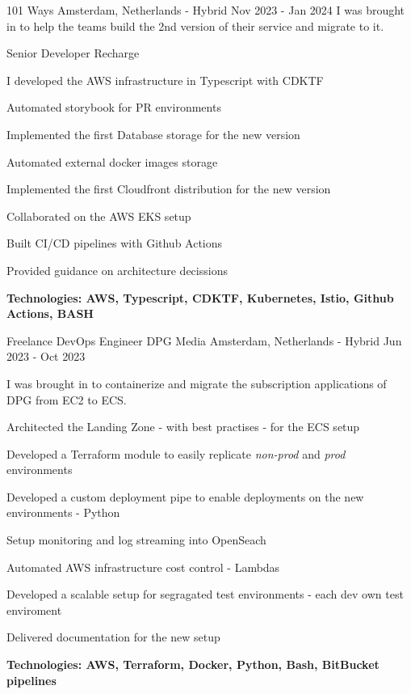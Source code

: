 \begin{cventries}
{101 Ways}
{Amsterdam, Netherlands - Hybrid}
{Nov 2023 - Jan 2024}
{I was brought in to help the teams build the 2nd version of their service and migrate to it.}
\hfill\begin{minipage}{\dimexpr\textwidth-1cm}
\xdef\tpd{\the\prevdepth}
\begin{cventrystack}
	\cventry
	{Senior Developer} %
	{Recharge} %
	{}
	{}
	{
		\begin{cvitems}
			\item {I developed the AWS infrastructure in Typescript with CDKTF}
			\item {Automated storybook for PR environments}
			\item {Implemented the first Database storage for the new version}
			\item {Automated external docker images storage}
			\item {Implemented the first Cloudfront distribution for the new version}
			\item {Collaborated on the AWS EKS setup}
			\item {Built CI/CD pipelines with Github Actions}
			\item {Provided guidance on architecture decissions}
			\item {\bfseries{Technologies:} AWS, Typescript, CDKTF, Kubernetes, Istio, Github Actions, BASH}
		\end{cvitems}
	}
\end{cventrystack}
\end{minipage}

\cventry
{Freelance DevOps Engineer} %
{DPG Media} %
{Amsterdam, Netherlands - Hybrid} %
{Jun 2023 - Oct 2023} %
{ %
I was brought in to containerize and migrate the subscription applications of DPG from EC2 to ECS.
\newline \hfill
	\begin{cvitems}
		\item {Architected the Landing Zone - with best practises - for the ECS setup}
		\item {Developed a Terraform module to easily replicate \emph{non-prod} and \emph{prod} environments}
		\item {Developed a custom deployment pipe to enable deployments on the new environments - Python}
		\item {Setup monitoring and log streaming into OpenSeach}
		\item {Automated AWS infrastructure cost control - Lambdas}
		\item {Developed a scalable setup for segragated test environments - each dev own test enviroment}
		\item {Delivered documentation for the new setup}
		\item {\bfseries{Technologies:} AWS, Terraform, Docker, Python, Bash, BitBucket pipelines}
	\end{cvitems}
}


\end{cventries}
